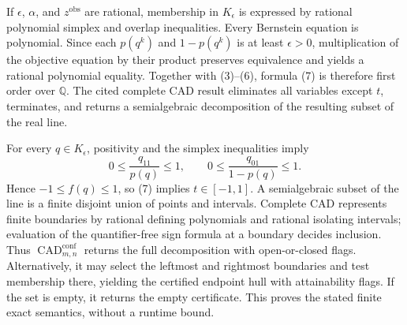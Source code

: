 If \(\epsilon\), \(\alpha\), and \(z^{\mathrm{obs}}\) are rational, membership in \(K_{\epsilon}\) is expressed by rational polynomial simplex and overlap inequalities.  Every Bernstein equation is polynomial.  Since each \(p(q^k)\) and \(1-p(q^k)\) is at least \(\epsilon>0\), multiplication of the objective equation by their product preserves equivalence and yields a rational polynomial equality.  Together with (3)--(6), formula (7) is therefore first order over \(\mathbb Q\).  The cited complete CAD result eliminates all variables except \(t\), terminates, and returns a semialgebraic decomposition of the resulting subset of the real line.

For every \(q\in K_{\epsilon}\), positivity and the simplex inequalities imply
\[
 0\leq\frac{q_{11}}{p(q)}\leq1,
 \qquad 0\leq\frac{q_{01}}{1-p(q)}\leq1.
\]
Hence \(-1\leq f(q)\leq1\), so (7) implies \(t\in[-1,1]\).  A semialgebraic subset of the line is a finite disjoint union of points and intervals.  Complete CAD represents finite boundaries by rational defining polynomials and rational isolating intervals; evaluation of the quantifier-free sign formula at a boundary decides inclusion.  Thus \(\operatorname{CAD}^{\mathrm{conf}}_{m,n}\) returns the full decomposition with open-or-closed flags.  Alternatively, it may select the leftmost and rightmost boundaries and test membership there, yielding the certified endpoint hull with attainability flags.  If the set is empty, it returns the empty certificate.  This proves the stated finite exact semantics, without a runtime bound.